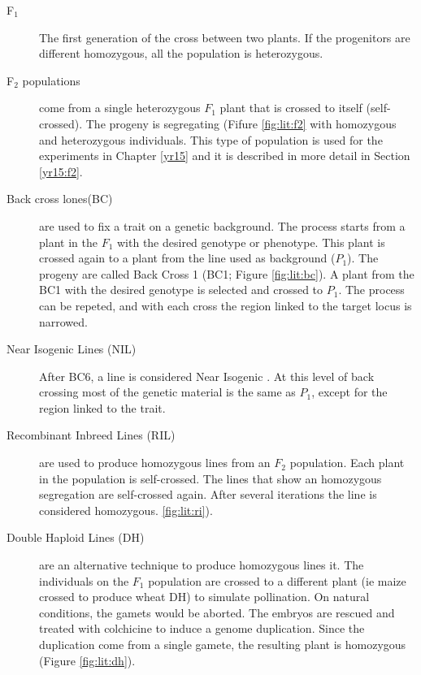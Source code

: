 \begin{description}
\item[F$_{1}$] The first generation of the cross between two plants. If the progenitors are different homozygous, all the population is heterozygous.  
\item[F$_{2}$ populations] come from a single heterozygous $F_{1}$ plant that is crossed to itself (self-crossed). The progeny is segregating (Fifure \ref{fig:lit:f2} with homozygous and heterozygous individuals. This type of population is used for the experiments in Chapter \ref{yr15} and it is described in more detail in Section \ref{yr15:f2}. 
\item[Back cross lones(BC)] are used to fix a trait on a genetic background. The process starts from a plant in the $F_{1}$ with the desired genotype or phenotype. This plant is crossed again to a plant from the line used as background ($P_{1}$). The progeny are called Back Cross 1 (BC1; Figure \ref{fig:lit:bc}). A plant from the BC1 with the desired genotype is selected and crossed to $P_{1}$. The process can be repeted, and with each cross the region linked to the target locus is narrowed. 
\item[Near Isogenic Lines (NIL)] After BC6, a line is considered Near Isogenic \citep{Stam1981}. At this level of back crossing most of the genetic material is the same as $P_{1}$, except for the region linked to the trait. 
\item[Recombinant Inbreed Lines (RIL)] are used to produce homozygous lines from an $F_{2}$ population. Each plant in the population is self-crossed. The lines that show an homozygous segregation are self-crossed again. After several iterations the line is considered homozygous. \ref{fig:lit:ri}).
\item[Double Haploid Lines (DH)] are an alternative technique to produce homozygous lines it. The individuals on the $F_{1}$ population are crossed to a different plant (ie maize crossed to produce wheat DH) to simulate pollination. On natural conditions, the gamets would be aborted. The embryos are rescued and treated with colchicine to induce a genome duplication. Since the duplication come from a single gamete, the resulting plant is homozygous (Figure \ref{fig:lit:dh}).

 
\end{description}

